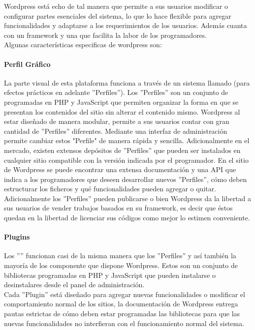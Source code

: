 Wordpress está echo de tal manera que permite a sus usuarios modificar o configurar partes esenciales del sistema, lo que lo hace flexible para agregar funcionalidades y adaptarse a los requerimientos de los usuarios. Además cuanta con un framework y una  que facilita la labor de los programadores.\\

Algunas características especificas de wordpress son:

\paragraph{Perfil Gráfico}	
La parte visual de esta plataforma funciona a través de un sistema llamado (para efectos prácticos en adelante ''Perfiles''). Los ''Perfiles'' son un conjunto de  programadas en PHP y JavaScript que permiten organizar la forma en que se presentan los contenidos del sitio sin alterar el contenido mismo. Wordpress al estar diseñado de manera modular, permite a sus usuarios contar con gran cantidad de ''Perfiles'' diferentes. Mediante una interfaz de administración permite cambiar estos "Perfile" de manera rápida y sencilla. Adicionalmente en el mercado, existen extensos depósitos de ''Perfiles'' que pueden ser instalados en cualquier sitio compatible con la versión indicada por el programador.
En el sitio de Wordpress se puede encontrar una extensa documentación y una API que indica a los programadores que deseen desarrollar nuevos ''Perfiles'', cómo deben estructurar los ficheros y qué funcionalidades pueden agregar o quitar. Adicionalmente los ''Perfiles'' pueden publicarse o bien Wordpress da la libertad a sus usuarios de vender trabajos basados en su framework, es decir que éstos quedan en la libertad de licenciar sus códigos como mejor lo estimen conveniente.\\

\paragraph{Plugins}
Los ''''  funcionan casi de la misma manera que los ''Perfiles'' y así también la mayoría de los componente que dispone Wordpress. Estos son un conjunto de bibliotecas programadas en PHP y JavaScript que pueden instalarse o desinstalares desde el panel de administración.\\
Cada ''Plugin'' está diseñado para agregar nuevas funcionalidades o modificar el comportamiento normal de los sitios, la documentación de Wordpress entrega pautas estrictas de cómo deben estar programadas las bibliotecas para que las nuevas funcionalidades no interfieran con el funcionamiento normal del sistema.

